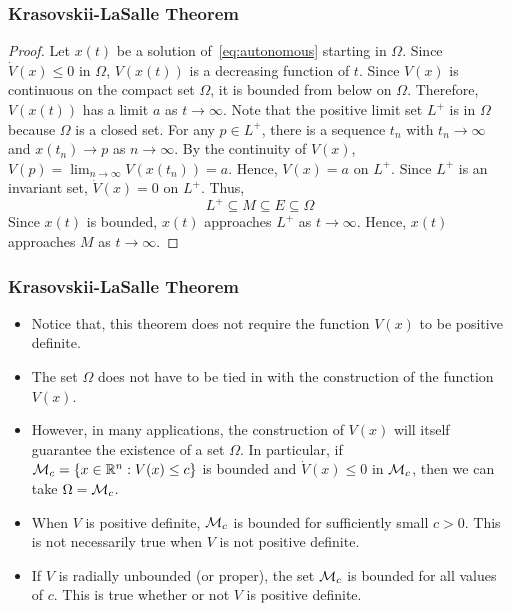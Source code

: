 \begin{frame}
    \frametitle{Krasovskii-LaSalle Theorem}

    \begin{proof}
        Let $x(t)$ be a solution of~\eqref{eq:autonomous} starting in $\Omega$.
        Since $\dot{V}(x) \leq 0$ in $\Omega$, $V(x(t))$ is a decreasing
        function of $t$. Since $V(x)$ is continuous on the compact set $\Omega$,
        it is bounded from below on $\Omega$. Therefore, $V(x(t))$ has a limit
        $a$ as $t \to \infty$. Note that the positive limit set $L^+$ is in
        $\Omega$ because $\Omega$ is a closed set. For any $p \in L^+$, there is
        a sequence $t_n$ with $t_n \to \infty$ and $x(t_n) \to p$ as $n \to
        \infty$. By the continuity of $V(x)$, $V(p) = \lim_{n \to \infty}
        V(x(t_n)) = a$. Hence, $V(x) = a$ on $L^+$. Since $L^+$ is an invariant
        set, $\dot{V}(x) = 0$ on $L^+$. Thus, \[ L^+ \subseteq M \subseteq E
        \subseteq \Omega \] Since $x(t)$ is bounded, $x(t)$ approaches $L^+$ as 
        $t \to \infty$. Hence, $x(t)$ approaches $M$ as $t \to \infty$.
    \end{proof}
\end{frame}

\begin{frame}
    \frametitle{Krasovskii-LaSalle Theorem}

    \begin{itemize}
        \item Notice that, this theorem does not require the function $V(x)$ to 
        be positive definite.
        \item The set $\Omega$ does not have to be tied in with the construction
        of the function $V(x)$.
        \item However, in many applications, the construction of $V(x)$ will
        itself guarantee the existence of a set $\Omega$. In particular, if
        $\mathcal{M}_c = \{x \in \mathbb{R}^n: V(x) \leq c\}$ is bounded and
        $\dot{V}(x) \leq 0$ in $\mathcal{M}_c$, then we can take $\Omega = \mathcal{M}_c$.
        \item When $V$ is positive definite, $\mathcal{M}_c$ is bounded for
        sufficiently small $c > 0$. This is not necessarily true when $V$ is not
        positive definite.
        \item If $V$ is radially unbounded (or proper), the set $\mathcal{M}_c$ is
        bounded for all values of $c$. This is true whether or not $V$ is
        positive definite.
    \end{itemize}
\end{frame}

